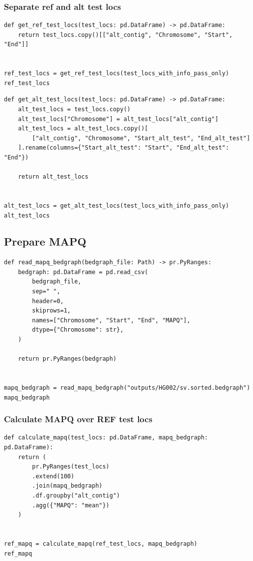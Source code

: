 \documentclass{article}
\begin{document}
\subsubsection{Separate ref and alt test locs}

\begin{verbatim}
def get_ref_test_locs(test_locs: pd.DataFrame) -> pd.DataFrame:
    return test_locs.copy()[["alt_contig", "Chromosome", "Start", "End"]]


ref_test_locs = get_ref_test_locs(test_locs_with_info_pass_only)
ref_test_locs
\end{verbatim}

\begin{verbatim}
def get_alt_test_locs(test_locs: pd.DataFrame) -> pd.DataFrame:
    alt_test_locs = test_locs.copy()
    alt_test_locs["Chromosome"] = alt_test_locs["alt_contig"]
    alt_test_locs = alt_test_locs.copy()[
        ["alt_contig", "Chromosome", "Start_alt_test", "End_alt_test"]
    ].rename(columns={"Start_alt_test": "Start", "End_alt_test": "End"})

    return alt_test_locs


alt_test_locs = get_alt_test_locs(test_locs_with_info_pass_only)
alt_test_locs
\end{verbatim}

\subsection{Prepare MAPQ}

\begin{verbatim}
def read_mapq_bedgraph(bedgraph_file: Path) -> pr.PyRanges:
    bedgraph: pd.DataFrame = pd.read_csv(
        bedgraph_file,
        sep=" ",
        header=0,
        skiprows=1,
        names=["Chromosome", "Start", "End", "MAPQ"],
        dtype={"Chromosome": str},
    )

    return pr.PyRanges(bedgraph)


mapq_bedgraph = read_mapq_bedgraph("outputs/HG002/sv.sorted.bedgraph")
mapq_bedgraph
\end{verbatim}

\subsubsection{Calculate MAPQ over REF test locs}

\begin{verbatim}
def calculate_mapq(test_locs: pd.DataFrame, mapq_bedgraph: pd.DataFrame):
    return (
        pr.PyRanges(test_locs)
        .extend(100)
        .join(mapq_bedgraph)
        .df.groupby("alt_contig")
        .agg({"MAPQ": "mean"})
    )


ref_mapq = calculate_mapq(ref_test_locs, mapq_bedgraph)
ref_mapq
\end{verbatim}
\end{document}
